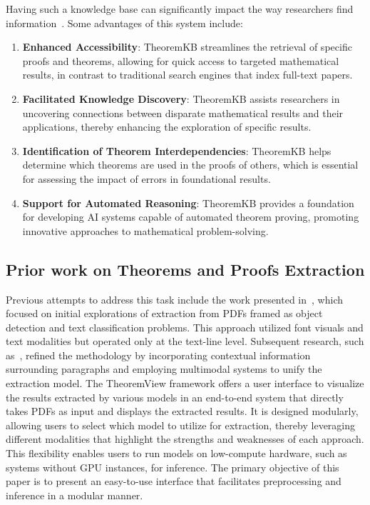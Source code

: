 \documentclass[runningheads]{llncs}
\begin{document}
Having such a knowledge base can significantly impact the way researchers
find information~\cite{sdp2024}. Some advantages of this system include:
\begin{enumerate}
	\item \textbf{Enhanced Accessibility}: TheoremKB streamlines the retrieval of specific proofs and theorems, allowing for quick access to targeted mathematical results, in contrast to traditional search engines that index full-text papers.
	\item \textbf{Facilitated Knowledge Discovery}: TheoremKB assists researchers in uncovering connections between disparate mathematical results and their applications, thereby enhancing the exploration of specific results.
	\item \textbf{Identification of Theorem Interdependencies}: TheoremKB helps determine which theorems are used in the proofs of others, which is essential for assessing the impact of errors in foundational results.
	\item \textbf{Support for Automated Reasoning}: TheoremKB provides a foundation for developing AI systems capable of automated theorem proving, promoting innovative approaches to mathematical problem-solving.
\end{enumerate}

\subsection{Prior work on Theorems and Proofs Extraction}

Previous attempts to address this task include the work presented in~\cite{mishra2021towards}, which focused on
initial explorations of extraction from PDFs framed as object detection and text classification problems.
This approach utilized font visuals and text modalities but operated only at the text-line level. Subsequent
research, such as~\cite{mishra2024multimodal}, refined the methodology by incorporating contextual information
surrounding paragraphs and employing multimodal systems to unify the extraction model.
The TheoremView framework offers a user interface to visualize the results extracted by various models in
an end-to-end system that directly takes PDFs as input and displays the extracted results. It is designed
modularly, allowing users to select which model to utilize for extraction, thereby leveraging different
modalities that highlight the strengths and weaknesses of each approach. This flexibility enables users
to run models on low-compute hardware, such as systems without GPU instances, for inference. The primary
objective of this paper is to present an easy-to-use interface that facilitates preprocessing and inference
in a modular manner.
\end{document}
